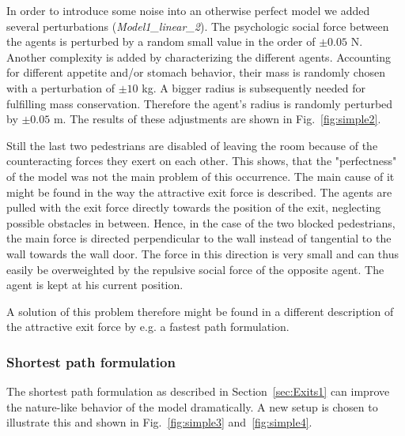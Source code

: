 \documentclass[11pt]{article}
\begin{document}
In order to introduce some noise into an otherwise perfect model we added several perturbations ({\it Model1\_linear\_2}). The psychologic social force between the agents is perturbed by a random small value in the order of $\pm 0.05$ N. Another complexity is added by characterizing the different agents. Accounting for different appetite and/or stomach behavior, their mass is randomly chosen with a perturbation of $\pm 10$ kg. A bigger radius is subsequently needed for fulfilling mass conservation. Therefore the agent's radius is randomly perturbed by $\pm 0.05$ m. The results of these adjustments are shown in Fig.~\ref{fig:simple2}.

Still the last two pedestrians are disabled of leaving the room because of the counteracting forces they exert on each other. This shows, that the "perfectness" of the model was not the main problem of this occurrence. The main cause of it might be found in the way the attractive exit force is described. The agents are pulled with the exit force directly towards the position of the exit, neglecting possible obstacles in between. Hence, in the case of the two blocked pedestrians, the main force is directed perpendicular to the wall instead of tangential to the wall towards the wall door. The force in this direction is very small and can thus easily be overweighted by the repulsive social force of the opposite agent. The agent is kept at his current position.

A solution of this problem therefore might be found in a different description of the attractive exit force by e.g. a fastest path formulation.


\subsubsection{Shortest path formulation}

The shortest path formulation as described in Section~\ref{sec:Exits1} can improve the nature-like behavior of the model dramatically. A new setup is chosen to illustrate this and shown in Fig.~\ref{fig:simple3} and~\ref{fig:simple4}.
\end{document}
